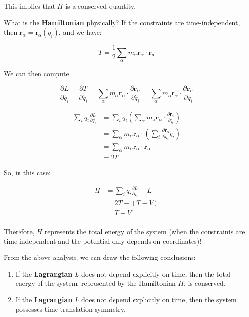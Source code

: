 This implies that $H$ is a conserved quantity.

What is the \textbf{Hamiltonian} physically? If the constraints are time-independent, then $\mathbf{r}_\alpha = \mathbf{r}_\alpha(q_i)$, and we have:

\[
    T=\frac{1}{2} \sum_\alpha m_\alpha \dot{\mathbf{r}}_\alpha \cdot \dot{\mathbf{r}}_\alpha
\]

We can then compute

\[
    \frac{\partial L}{\partial \dot{q_i}} = \frac{\partial T}{\partial \dot{q_i}} = \sum_\alpha m_\alpha \dot{\mathbf{r}}_\alpha \cdot \frac{\partial \dot{\mathbf{r}}_\alpha}{\partial \dot{q_i}} = \sum_\alpha m_\alpha \dot{\mathbf{r}}_\alpha \cdot \frac{\partial \mathbf{r}_\alpha}{\partial q_i}
\]

\begin{align*}
    \sum_i \dot{q_i} \frac{\partial L}{\partial \dot{q_i}} &= \sum_i \dot{q_i} \left(\sum_\alpha m_\alpha \dot{\mathbf{r}}_\alpha \cdot \frac{\partial \mathbf{r}_\alpha}{\partial q_i}\right) \\
    &= \sum_\alpha m_\alpha \dot{\mathbf{r}}_\alpha \cdot \left(\sum_i \frac{\partial \mathbf{r}_\alpha}{\partial q_i} \dot{q_i}\right) \\
    &= \sum_\alpha m_\alpha \dot{\mathbf{r}}_\alpha \cdot \dot{\mathbf{r}}_\alpha \\
    &= 2T
\end{align*}

So, in this case:

\begin{align*}
    H &= \sum_i \dot{q_i} \frac{\partial L}{\partial \dot{q_i}} - L \\
    &= 2T - \left(T - V\right) \\
    &= T + V \\
\end{align*}

Therefore, $H$ represents the total energy of the system (when the constraints are time independent and the potential only depends on coordinates)!

From the above analysis, we can draw the following conclusions:

\begin{enumerate}
    \item If the \textbf{Lagrangian} $L$ does not depend explicitly on time, then the total energy of the system, represented by the Hamiltonian $H$, is conserved.
    \item If the \textbf{Lagrangian} $L$ does not depend explicitly on time, then the system possesses time-translation symmetry.
\end{enumerate}

